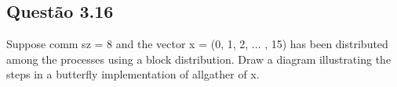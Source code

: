 

\subsection{Questão 3.16}

Suppose comm sz = 8 and the vector x = (0, 1, 2, ... , 15) has been distributed among the processes using a block distribution. Draw a diagram illustrating the steps in a butterfly implementation of allgather of x. \\

